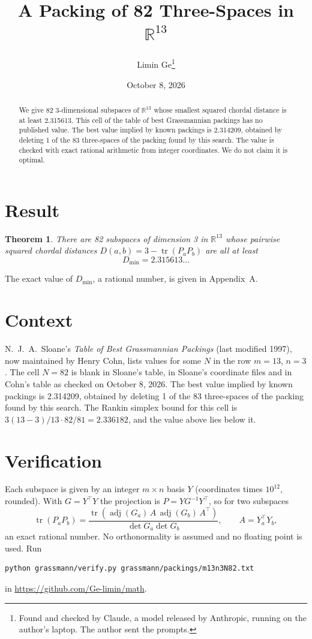 \documentclass[11pt,a4paper]{article}
\title{A Packing of 82 Three-Spaces in $\mathbb{R}^{13}$}
\author{Limin Ge\thanks{Found and checked by Claude, a model released by Anthropic, running on the author's laptop. The author sent the prompts.}}
\date{October 8, 2026}
\newtheorem*{theorem}{Theorem}
\begin{document}
\maketitle
\begin{abstract}
We give 82 3-dimensional subspaces of $\mathbb{R}^{13}$ whose smallest squared chordal distance is at least 2.315613. This cell of the table of best Grassmannian packings has no published value. The best value implied by known packings is 2.314209, obtained by deleting 1 of the 83 three-spaces of the packing found by this search. The value is checked with exact rational arithmetic from integer coordinates. We do not claim it is optimal.
\end{abstract}

\section{Result}
\begin{theorem}
There are 82 subspaces of dimension 3 in $\mathbb{R}^{13}$ whose pairwise squared chordal distances $D(a,b) = 3 - \operatorname{tr}(P_aP_b)$ are all at least
\[ D_{\min} = 2.315613\ldots \]
\end{theorem}
The exact value of $D_{\min}$, a rational number, is given in Appendix~A.


\section{Context}
N.~J.~A.~Sloane's \emph{Table of Best Grassmannian Packings} (last modified 1997), now maintained by Henry Cohn, lists values for some $N$ in the row $m=13$, $n=3$. The cell $N=82$ is blank in Sloane's table, in Sloane's coordinate files and in Cohn's table as checked on October 8, 2026. The best value implied by known packings is 2.314209, obtained by deleting 1 of the 83 three-spaces of the packing found by this search. The Rankin simplex bound for this cell is $3(13-3)/13\cdot 82/81 = 2.336182$, and the value above lies below it.


\section{Verification}
Each subspace is given by an integer $m\times n$ basis $Y$ (coordinates times $10^{12}$, rounded). With $G=Y^\top Y$ the projection is $P=YG^{-1}Y^\top$, so for two subspaces
\[ \operatorname{tr}(P_aP_b)=\frac{\operatorname{tr}(\operatorname{adj}(G_a)\,A\,\operatorname{adj}(G_b)\,A^\top)}{\det G_a\det G_b},\qquad A=Y_a^\top Y_b, \]
an exact rational number. No orthonormality is assumed and no floating point is used. Run
\begin{verbatim}
python grassmann/verify.py grassmann/packings/m13n3N82.txt
\end{verbatim}
in \url{https://github.com/Ge-limin/math}.
\end{document}
